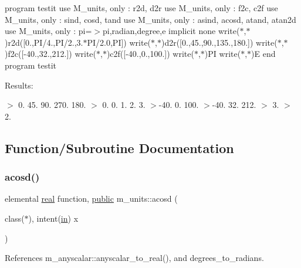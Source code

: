 program testit use M\+\_\+units, only \+: r2d, d2r use M\+\_\+units, only \+: f2c, c2f use M\+\_\+units, only \+: sind, cosd, tand use M\+\_\+units, only \+: asind, acosd, atand, atan2d use M\+\_\+units, only \+: pi=$>$pi,radian,degree,e implicit none write($\ast$,$\ast$)r2d(\mbox{[}0.,P\+I/4.,P\+I/2.,3.$\ast$\+P\+I/2.0,PI\mbox{]}) write($\ast$,$\ast$)d2r(\mbox{[}0.,45.,90.,135.,180.\mbox{]}) write($\ast$,$\ast$)f2c(\mbox{[}-\/40.,32.,212.\mbox{]}) write($\ast$,$\ast$)c2f(\mbox{[}-\/40.,0.,100.\mbox{]}) write($\ast$,$\ast$)PI write($\ast$,$\ast$)E end program testit

Results\+:

$>$ 0. 45. 90. 270. 180. $>$ 0. 0. 1. 2. 3. $>$-\/40. 0. 100. $>$-\/40. 32. 212. $>$ 3. $>$ 2. 

\subsection{Function/\+Subroutine Documentation}
\mbox{\label{namespacem__units_af4446b30251a8832b90b9c6c596104d6}} 
\subsubsection{\texorpdfstring{acosd()}{acosd()}}
{\footnotesize\ttfamily elemental \hyperlink{read__watch_83_8txt_abdb62bde002f38ef75f810d3a905a823}{real} function, \hyperlink{M__stopwatch_83_8txt_a2f74811300c361e53b430611a7d1769f}{public} m\+\_\+units\+::acosd (\begin{DoxyParamCaption}\item[{class($\ast$), intent(\hyperlink{M__journal_83_8txt_afce72651d1eed785a2132bee863b2f38}{in})}]{x }\end{DoxyParamCaption})}



References m\+\_\+anyscalar\+::anyscalar\+\_\+to\+\_\+real(), and degrees\+\_\+to\+\_\+radians.

\mbox{\label{namespacem__units_ad2b3de1ae68e3090d6c5793fc50dce77}} 
